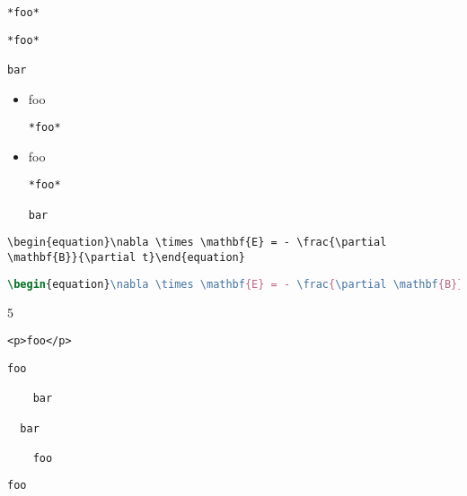 
\def\mytitle{Fenced Code Blocks}


\begin{verbatim}
*foo*
\end{verbatim}

\begin{verbatim}
*foo*

bar
\end{verbatim}

\begin{itemize}
\item{} foo

\begin{verbatim}
*foo*
\end{verbatim}

\item{} foo

\begin{verbatim}
*foo*

bar
\end{verbatim}

\end{itemize}

\begin{verbatim}
\begin{equation}\nabla \times \mathbf{E} = - \frac{\partial \mathbf{B}}{\partial t}\end{equation}
\end{verbatim}

\begin{lstlisting}[language=tex]
\begin{equation}\nabla \times \mathbf{E} = - \frac{\partial \mathbf{B}}{\partial t}\end{equation}
\end{lstlisting}

5

\begin{verbatim}
<p>foo</p>
\end{verbatim}

\begin{verbatim}
foo

	bar

  bar

    foo
\end{verbatim}

\begin{verbatim}
foo
\end{verbatim}



